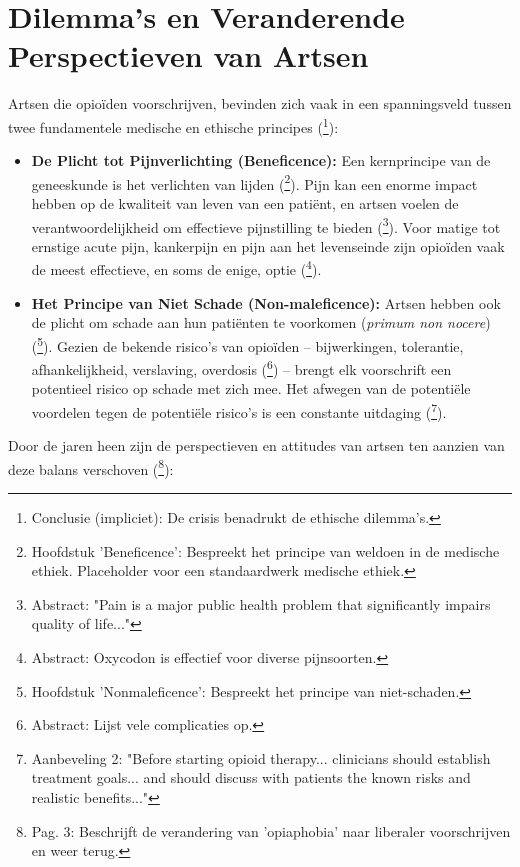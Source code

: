 \documentclass[11pt, a4paper]{report} %
\begin{document}
\section{Dilemma's en Veranderende Perspectieven van Artsen}
Artsen die opioïden voorschrijven, bevinden zich vaak in een spanningsveld tussen twee fundamentele medische en ethische principes (\cite{Weiner2017OpioidCrisisConsequences}\footnote{Conclusie (impliciet): De crisis benadrukt de ethische dilemma's.}):
\begin{itemize}
    \item \textbf{De Plicht tot Pijnverlichting (Beneficence):} Een kernprincipe van de geneeskunde is het verlichten van lijden (\cite{BeauchampChildress2019PrinciplesBiomedicalEthics}\footnote{Hoofdstuk 'Beneficence': Bespreekt het principe van weldoen in de medische ethiek. Placeholder voor een standaardwerk medische ethiek.}). Pijn kan een enorme impact hebben op de kwaliteit van leven van een patiënt, en artsen voelen de verantwoordelijkheid om effectieve pijnstilling te bieden (\cite{Katz2002ImpactPainQoL}\footnote{Abstract: "Pain is a major public health problem that significantly impairs quality of life..."}). Voor matige tot ernstige acute pijn, kankerpijn en pijn aan het levenseinde zijn opioïden vaak de meest effectieve, en soms de enige, optie (\cite{Riley2008OxycodoneReview}\footnote{Abstract: Oxycodon is effectief voor diverse pijnsoorten.}).
    \item \textbf{Het Principe van Niet Schade (Non-maleficence):} Artsen hebben ook de plicht om schade aan hun patiënten te voorkomen (\textit{primum non nocere}) (\cite{BeauchampChildress2019PrinciplesBiomedicalEthics}\footnote{Hoofdstuk 'Nonmaleficence': Bespreekt het principe van niet-schaden.}). Gezien de bekende risico's van opioïden – bijwerkingen, tolerantie, afhankelijkheid, verslaving, overdosis (\cite{Benyamin2008OpioidComplications}\footnote{Abstract: Lijst vele complicaties op.}) – brengt elk voorschrift een potentieel risico op schade met zich mee. Het afwegen van de potentiële voordelen tegen de potentiële risico's is een constante uitdaging (\cite{Dowell2016CDCGuideline}\footnote{Aanbeveling 2: "Before starting opioid therapy... clinicians should establish treatment goals... and should discuss with patients the known risks and realistic benefits..."}).
\end{itemize}
Door de jaren heen zijn de perspectieven en attitudes van artsen ten aanzien van deze balans verschoven (\cite{Maclean2020EconomicStudiesOpioid}\footnote{Pag. 3: Beschrijft de verandering van 'opiaphobia' naar liberaler voorschrijven en weer terug.}):
\end{document}

